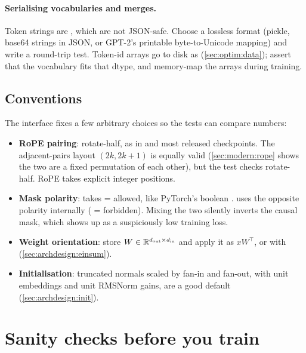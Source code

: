 \paragraph{Serialising vocabularies and merges.} Token strings are , which are not
JSON-safe. Choose a lossless format (pickle, base64 strings in JSON, or GPT-2's printable
byte-to-Unicode mapping) and write a round-trip test. Token-id arrays go to disk as 
(\cref{sec:optim:data}); assert that the vocabulary fits that dtype, and memory-map the arrays
during training.

\subsection{Conventions}\label{sec:proj1:conventions}

The interface fixes a few arbitrary choices so the tests can compare numbers:
\begin{itemize}
  \item \textbf{RoPE pairing}: rotate-half, as in  and most
        released checkpoints. The adjacent-pairs layout $(2k, 2k{+}1)$ is equally valid
        (\cref{sec:modern:rope} shows the two are a fixed permutation of each other), but the test
        checks rotate-half. RoPE takes explicit integer positions.
  \item \textbf{Mask polarity}:  takes  = allowed, like PyTorch's
        boolean .  uses the opposite polarity
        internally ( = forbidden). Mixing the two silently inverts the causal mask, which
        shows up as a suspiciously low training loss.
  \item \textbf{Weight orientation}: store $W\in\mathbb{R}^{d_\text{out}\times d_\text{in}}$ and apply it
        as $xW^\top$, or with  (\cref{sec:archdesign:einsum}).
  \item \textbf{Initialisation}: truncated normals scaled by fan-in and fan-out, with unit
        embeddings and unit RMSNorm gains, are a good default (\cref{sec:archdesign:init}).
\end{itemize}

\section{Sanity checks before you train}\label{sec:proj1:milestones}

